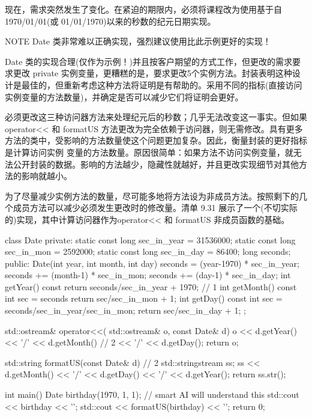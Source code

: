现在，需求突然发生了变化。在紧迫的期限内，必须将课程改为使用基于自 1970/01/01(或 01/01/1970)以来的秒数的纪元日期实现。

\begin{myNotic}{NOTE}
Date 类非常难以正确实现，强烈建议使用比此示例更好的实现！
\end{myNotic}


Date 类的实现合理(仅作为示例！)并且按客户期望的方式工作，但更改的需求要求更改 private 实例变量，更糟糕的是，要求更改5个实例方法。封装表明这种设计是最佳的，但重新考虑这种方法将证明是有帮助的。采用不同的指标(直接访问实例变量的方法数量)，并确定是否可以减少它们将证明会更好。

必须更改这三种访问器方法来处理纪元后的秒数；几乎无法改变这一事实。但如果 operator<{}< 和 formatUS 方法更改为完全依赖于访问器，则无需修改。具有更多方法的类中，受影响的方法数量使这个问题更加复杂。因此，衡量封装的更好指标是计算访问实例 变量的方法数量。原因很简单：如果方法不访问实例变量，就无法公开封装的数据。影响的方法越少，隐藏性就越好，并且更改实现细节对其他方法的影响就越小。


为了尽量减少实例方法的数量，尽可能多地将方法设为非成员方法。按照剩下的几个成员方法可以减少必须发生更改时的修改量。清单 9.31 展示了一个(不切实际的)实现，其中计算访问器作为operator<{}< 和 formatUS 非成员函数的基础。


\begin{cpp}
class Date {
private:
  static const long sec_in_year = 31536000;
  static const long sec_in_mon = 2592000;
  static const long sec_in_day = 86400;
  long seconds;
public:
  Date(int year, int month, int day) {
    seconds = (year-1970) * sec_in_year;
    seconds += (month-1) * sec_in_mon;
    seconds += (day-1) * sec_in_day;
  }
  int getYear() const {
    return seconds/sec_in_year + 1970; } // 1
  int getMonth() const {
    int sec = seconds %
    return sec/sec_in_mon + 1;
  }
  int getDay() const {
    int sec = seconds/sec_in_year/sec_in_mon;
    return sec/sec_in_day + 1;
  }
};

std::ostream& operator<<(
  std::ostream& o, const Date& d) {
  o << d.getYear() << '/' << d.getMonth() // 2
    << '/' << d.getDay();
  return o;
}

std::string formatUS(const Date& d) { // 2
  std::stringstream ss;
  ss << d.getMonth() << '/' << d.getDay() << '/' << d.getYear();
  return ss.str();
}

int main() {
  Date birthday(1970, 1, 1); // smart AI will understand this
  std::cout << birthday << '\n';
  std::cout << formatUS(birthday) << '\n';
  return 0;
}
\end{cpp}

